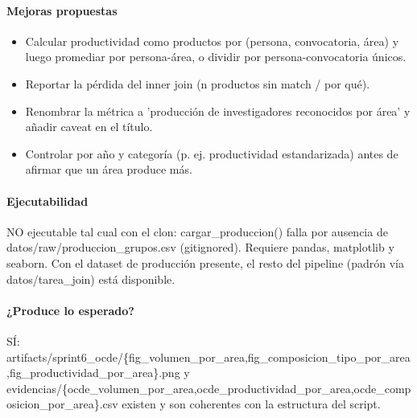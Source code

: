 \paragraph{Mejoras propuestas}
\begin{itemize}
  \item Calcular productividad como productos por (persona, convocatoria, área) y luego promediar por persona-área, o dividir por persona-convocatoria únicos.
  \item Reportar la pérdida del inner join (n productos sin match / por qué).
  \item Renombrar la métrica a 'producción de investigadores reconocidos por área' y añadir caveat en el título.
  \item Controlar por año y categoría (p. ej. productividad estandarizada) antes de afirmar que un área produce más.
\end{itemize}

\paragraph{Ejecutabilidad}
NO ejecutable tal cual con el clon: cargar\_produccion() falla por ausencia de datos/raw/produccion\_grupos.csv (gitignored). Requiere pandas, matplotlib y seaborn. Con el dataset de producción presente, el resto del pipeline (padrón vía datos/tarea\_join) está disponible.

\paragraph{¿Produce lo esperado?}
SÍ: artifacts/sprint6\_ocde/\{fig\_volumen\_por\_area,fig\_composicion\_tipo\_por\_area,fig\_productividad\_por\_area\}.png y evidencias/\{ocde\_volumen\_por\_area,ocde\_productividad\_por\_area,ocde\_composicion\_por\_area\}.csv existen y son coherentes con la estructura del script.

